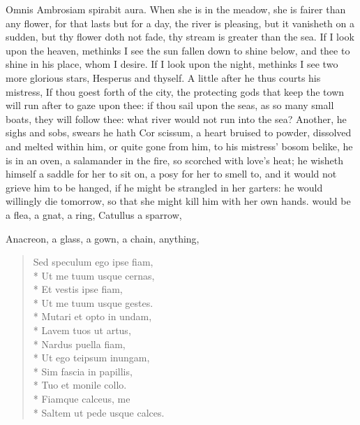 Omnis Ambrosiam spirabit aura. When she is in the meadow, she is
fairer than any flower, for that lasts but for a day, the river is
pleasing, but it vanisheth on a sudden, but thy flower doth not fade,
thy stream is greater than the sea. If I look upon the heaven, methinks
I see the sun fallen down to shine below, and thee to shine in his
place, whom I desire. If I look upon the night, methinks I see two more
glorious stars, Hesperus and thyself. A little after he thus courts his
mistress,  If thou goest forth of the city, the protecting gods
that keep the town will run after to gaze upon thee: if thou sail upon
the seas, as so many small boats, they will follow thee: what river
would not run into the sea? Another, he sighs and sobs, swears he hath
Cor scissum, a heart bruised to powder, dissolved and melted within
him, or quite gone from him, to his mistress' bosom belike, he is in an
oven, a salamander in the fire, so scorched with love's heat; he
wisheth himself a saddle for her to sit on, a posy for her to smell to,
and it would not grieve him to be hanged, if he might be strangled in
her garters: he would willingly die tomorrow, so that she might kill
him with her own hands. \Ovid would be a flea, a gnat, a ring,
Catullus a sparrow,

Anacreon, a glass, a gown, a chain, anything,
\begin{latin}
\begin{verse}
Sed speculum ego ipse fiam,\\*
Ut me tuum usque cernas,\\*
Et vestis ipse fiam,\\*
Ut me tuum usque gestes.\\*
Mutari et opto in undam,\\*
Lavem tuos ut artus,\\*
Nardus puella fiam,\\*
Ut ego teipsum inungam,\\*
Sim fascia in papillis,\\*
Tuo et monile collo.\\*
Fiamque calceus, me\\*
Saltem ut pede usque calces.
\end{verse}
\end{latin}

